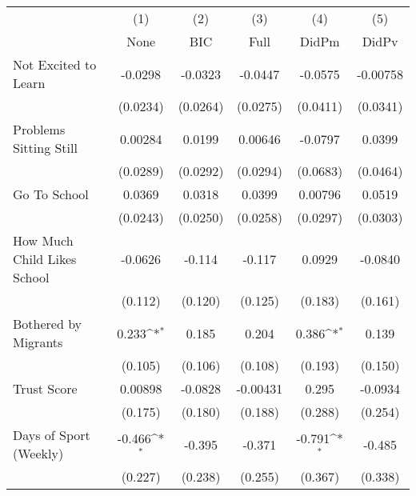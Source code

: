 {
\def\sym#1{\ifmmode^{#1}\else\(^{#1}\)\fi}
\begin{tabular}{l*{5}{c}}
\toprule
            &\multicolumn{1}{c}{(1)}&\multicolumn{1}{c}{(2)}&\multicolumn{1}{c}{(3)}&\multicolumn{1}{c}{(4)}&\multicolumn{1}{c}{(5)}\\
            &\multicolumn{1}{c}{None}&\multicolumn{1}{c}{BIC}&\multicolumn{1}{c}{Full}&\multicolumn{1}{c}{DidPm}&\multicolumn{1}{c}{DidPv}\\
\midrule
Not Excited to Learn&     -0.0298         &     -0.0323         &     -0.0447         &     -0.0575         &    -0.00758         \\
            &    (0.0234)         &    (0.0264)         &    (0.0275)         &    (0.0411)         &    (0.0341)         \\
\addlinespace
Problems Sitting Still&     0.00284         &      0.0199         &     0.00646         &     -0.0797         &      0.0399         \\
            &    (0.0289)         &    (0.0292)         &    (0.0294)         &    (0.0683)         &    (0.0464)         \\
\addlinespace
Go To School&      0.0369         &      0.0318         &      0.0399         &     0.00796         &      0.0519         \\
            &    (0.0243)         &    (0.0250)         &    (0.0258)         &    (0.0297)         &    (0.0303)         \\
\addlinespace
How Much Child Likes School&     -0.0626         &      -0.114         &      -0.117         &      0.0929         &     -0.0840         \\
            &     (0.112)         &     (0.120)         &     (0.125)         &     (0.183)         &     (0.161)         \\
\addlinespace
Bothered by Migrants&       0.233\sym{*}  &       0.185         &       0.204         &       0.386\sym{*}  &       0.139         \\
            &     (0.105)         &     (0.106)         &     (0.108)         &     (0.193)         &     (0.150)         \\
\addlinespace
Trust Score &     0.00898         &     -0.0828         &    -0.00431         &       0.295         &     -0.0934         \\
            &     (0.175)         &     (0.180)         &     (0.188)         &     (0.288)         &     (0.254)         \\
\addlinespace
Days of Sport (Weekly)&      -0.466\sym{*}  &      -0.395         &      -0.371         &      -0.791\sym{*}  &      -0.485         \\
            &     (0.227)         &     (0.238)         &     (0.255)         &     (0.367)         &     (0.338)         \\
\bottomrule
\end{tabular}
}
